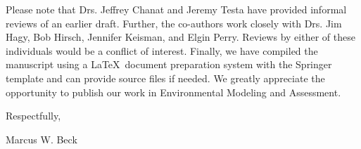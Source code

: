 \documentclass[a4paper,12pt]{article}
\begin{document}
Please note that Drs. Jeffrey Chanat and Jeremy Testa have provided informal reviews of an earlier draft.  Further, the co-authors work closely with Drs. Jim Hagy, Bob Hirsch, Jennifer Keisman, and Elgin Perry.  Reviews by either of these individuals would be a conflict of interest.  Finally, we have compiled the manuscript using a \LaTeX\ document preparation system with the Springer template and can provide source files if needed. We greatly appreciate the opportunity to publish our work in Environmental Modeling and Assessment.\vspace{0.5in}

\hspace{4.5in}Respectfully,

\hspace{4.5in}Marcus W. Beck
\end{document}
